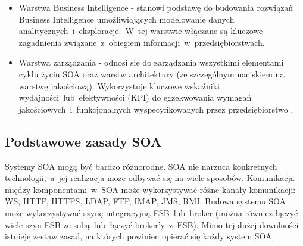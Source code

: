 \begin{itemize}
\item{Warstwa Business Intelligence - stanowi podstawę do budowania rozwiązań Business Intelligence umożliwiających modelowanie danych analitycznych~i~eksploracje.~W~tej warstwie włączane są kluczowe zagadnienia związane~z~obiegiem informacji~w~przedsiębiorstwach.}
\item{Warstwa zarządzania - odnosi się do zarządzania wszystkimi elementami cyklu życiu SOA oraz warstw architektury (ze szczególnym naciskiem na warstwę jakościową). Wykorzystuje kluczowe wskaźniki wydajności~lub~efektywności (KPI) do egzekwowania wymagań jakościowych~i~funkcjonalnych wyspecyfikowanych przez przedsiębiorstwo \cite{PlatIntGor}.}
\end{itemize}

\subsection{Podstawowe zasady SOA}
Systemy SOA mogą być bardzo różnorodne. SOA nie narzuca konkretnych technologii,~a~jej realizacja może odbywać się na wiele sposobów. Komunikacja między komponentami~w~SOA może wykorzystywać różne kanały komunikacji: WS, HTTP, HTTPS, LDAP, FTP, IMAP, JMS, RMI. Budowa systemu SOA może wykorzystywać szynę integracyjną ESB~lub~broker (można również łączyć wiele szyn ESB ze sobą~lub~łączyć broker’y~z~ESB). Mimo tej dużej dowolności istnieje zestaw zasad, na których powinien opierać się każdy system SOA.
